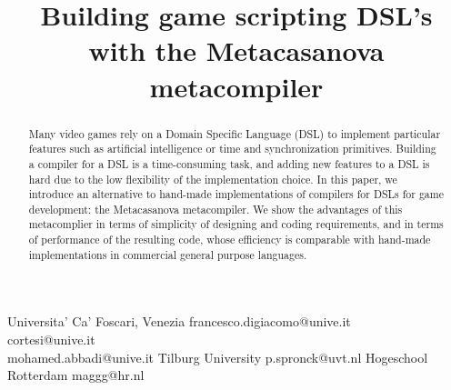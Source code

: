 \documentclass{sigplanconf}
\begin{document}
\setlength{\pdfpageheight}{\paperheight}
\setlength{\pdfpagewidth}{\paperwidth}






\title{Building game scripting DSL's with the Metacasanova metacompiler}
\subtitle{}

           {Universita' Ca' Foscari, Venezia}
           {francesco.digiacomo@unive.it \\ cortesi@unive.it \\
           	mohamed.abbadi@unive.it}
           {Tilburg University}
           {p.spronck@uvt.nl}
		   {Hogeschool Rotterdam}
		   {maggg@hr.nl}

\maketitle

\begin{abstract}
Many video games rely on a Domain Specific Language (DSL) to implement
particular features such as artificial intelligence or time and
synchronization primitives.
Building a compiler for a DSL is a time-consuming task, and adding new
features to a DSL is hard  due to the low flexibility of the
implementation choice.
In this paper, we introduce an alternative to hand-made
implementations of compilers for DSLs  for game development: the
Metacasanova metacompiler.
We show the advantages of this metacomplier  in terms of simplicity of
designing and coding requirements, and in terms of  performance of the
resulting code, whose efficiency is comparable with hand-made
implementations in commercial general purpose languages.
\end{abstract}
\end{document}
